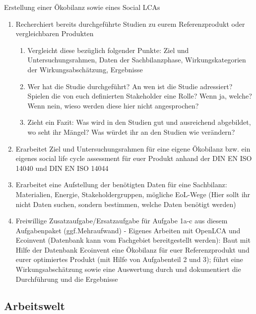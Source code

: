 \documentclass[headinclude=true]{scrartcl}
\begin{document}
Erstellung einer Ökobilanz sowie eines Social LCAs

\begin{enumerate}
	\item
	      Recherchiert bereits durchgeführte Studien zu eurem Referenzprodukt oder vergleichbaren Produkten

	      \begin{enumerate}
		      \item
		            Vergleicht diese bezüglich folgender Punkte: Ziel und
		            Untersuchungsrahmen, Daten der Sachbilanzphase, Wirkungskategorien
		            der Wirkungsabschätzung, Ergebnisse
		      \item
		            Wer hat die Studie durchgeführt? An wen ist die Studie adressiert?
		            Spielen die von euch definierten Stakeholder eine Rolle? Wenn ja, welche? Wenn nein, wieso werden
		            diese hier nicht angesprochen?
		      \item
		            Zieht ein Fazit: Was wird in den Studien gut und ausreichend abgebildet, wo seht ihr Mängel? Was würdet ihr an den Studien wie verändern?
	      \end{enumerate}
	\item
	      Erarbeitet Ziel und Untersuchungsrahmen für eine eigene Ökobilanz bzw.
	      ein eigenes social life cycle assessment für euer Produkt anhand der DIN EN ISO 14040 und DIN EN ISO 14044
	\item
	      Erarbeitet eine Aufstellung der benötigten Daten für eine Sachbilanz: Materialien, Energie, Stakeholdergruppen, mögliche EoL-Wege (Hier sollt ihr nicht Daten suchen, sondern bestimmen, welche Daten benötigt werden)
	\item
	      Freiwillige Zusatzaufgabe/Ersatzaufgabe für Aufgabe 1a-c aus diesem Aufgabenpaket (ggf.Mehraufwand) - Eigenes Arbeiten mit OpenLCA und Ecoinvent (Datenbank kann vom Fachgebiet bereitgestellt werden): Baut mit Hilfe der Datenbank Ecoinvent eine Ökobilanz für euer Referenzprodukt und eurer optimiertes Produkt (mit Hilfe von Aufgabenteil 2 und 3); führt eine Wirkungsabschätzung sowie eine Auswertung durch und dokumentiert die Durchführung und die Ergebnisse
\end{enumerate}

\subsection{Arbeitswelt}
\label{Arbeitswelt}
\end{document}
